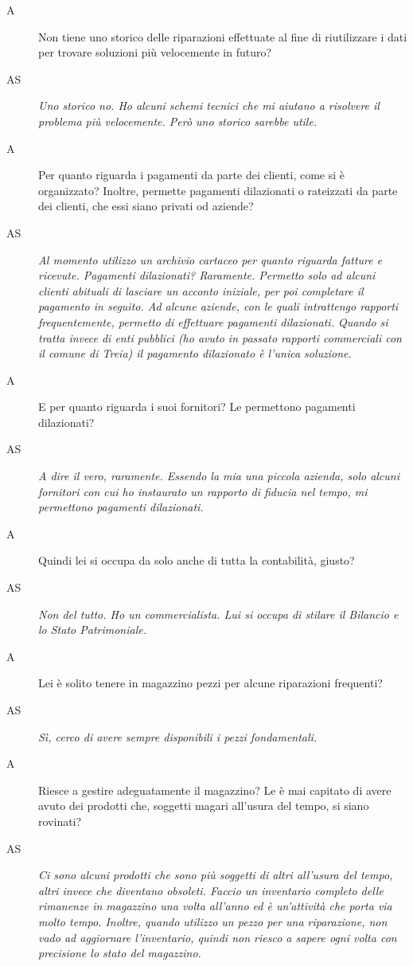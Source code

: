 \begin{description}
 			\item[A]
 				Non tiene uno storico delle riparazioni effettuate al fine di riutilizzare i dati per trovare soluzioni più velocemente in futuro?
 			\item[AS]
 				\emph{Uno storico no. Ho alcuni schemi tecnici che mi aiutano a risolvere il problema più velocemente. Però uno storico sarebbe utile.}
 			\item[A]
 				Per quanto riguarda i pagamenti da parte dei clienti, come si è organizzato? Inoltre, permette pagamenti dilazionati o rateizzati da parte dei clienti, che essi siano privati od aziende?
 			\item[AS]
 				\emph{Al momento utilizzo un archivio cartaceo per quanto riguarda fatture e ricevute. Pagamenti dilazionati? Raramente. Permetto solo ad alcuni clienti abituali di lasciare un acconto iniziale, per poi completare il pagamento in seguito. Ad alcune aziende, con le quali intrattengo rapporti frequentemente, permetto di effettuare pagamenti dilazionati. Quando si tratta invece di enti pubblici (ho avuto in passato rapporti commerciali con il comune di Treia) il pagamento dilazionato è l'unica soluzione.}
 			\item[A]
 				E per quanto riguarda i suoi fornitori? Le permettono pagamenti dilazionati?
 			\item[AS]
 				\emph{A dire il vero, raramente. Essendo la mia una piccola azienda, solo alcuni fornitori con cui ho instaurato un rapporto di fiducia nel tempo, mi permettono pagamenti dilazionati.}
 			\item[A]
 				Quindi lei si occupa da solo anche di tutta la contabilità, giusto?
 			\item[AS]
 				\emph{Non del tutto. Ho un commercialista. Lui si occupa di stilare il Bilancio e lo Stato Patrimoniale.}
 			\item[A]
 				Lei è solito tenere in magazzino pezzi per alcune riparazioni frequenti?
 			\item[AS]
 				\emph{Sì, cerco di avere sempre disponibili i pezzi fondamentali.}
 			\item[A]
 				Riesce a gestire adeguatamente il magazzino? Le è mai capitato di avere avuto dei prodotti che, soggetti magari all'usura del tempo, si siano rovinati?
 			\item[AS]
 				\emph{Ci sono alcuni prodotti che sono più soggetti di altri all'usura del tempo, altri invece che diventano obsoleti. Faccio un inventario completo delle rimanenze in magazzino una volta all'anno ed è un'attività che porta via molto tempo. Inoltre, quando utilizzo un pezzo per una riparazione, non vado ad aggiornare l'inventario, quindi non riesco a sapere ogni volta con precisione lo stato del magazzino.}

\end{description}

